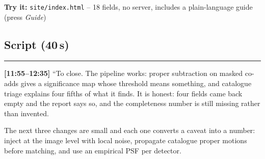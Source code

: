 \documentclass[11pt,a4paper]{article}
\begin{document}
\begin{center}

\smallskip
{\normalsize \textbf{Try it:} \texttt{site/index.html} -- 18 fields, no server, includes a plain-language guide (press \emph{Guide})}
\end{center}

\subsection*{Script (40\,s)}
\noindent\rule{\linewidth}{0.3pt}\par\smallskip\noindent
\textbf{[11:55--12:35]} ``To close. The pipeline works: proper subtraction on masked co-adds gives a
significance map whose threshold means something, and catalogue triage explains four fifths of what it
finds. It is honest: four fields came back empty and the report says so, and the completeness number is
still missing rather than invented.

The next three changes are small and each one converts a caveat into a number: inject at the image
level with local noise, propagate catalogue proper motions before matching, and use an empirical PSF
per detector.
\end{document}
